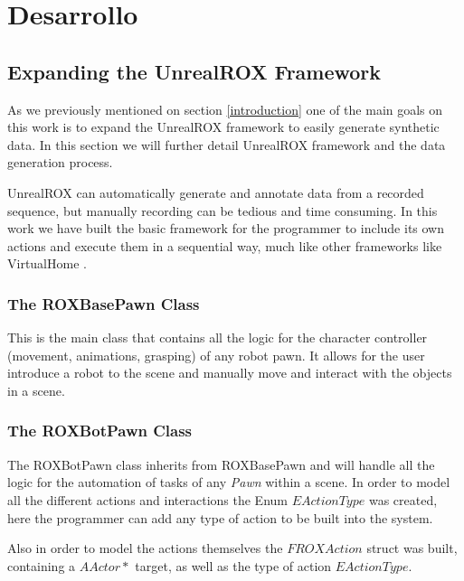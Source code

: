 
\chapter{Desarrollo}
\label{desarrollo}

\section{Expanding the UnrealROX Framework}
As we previously mentioned on section \ref{introduction} one of the main goals on this work is to expand the UnrealROX framework to easily generate synthetic data. In this section we will further detail UnrealROX framework and the data generation process.

UnrealROX can automatically generate and annotate data from a recorded sequence, but manually recording can be tedious and time consuming. In this work we have built the basic framework for the programmer to include its own actions and execute them in a sequential way, much like other frameworks like VirtualHome \cite{virtualhome2018}. 

\subsection{The ROXBasePawn Class}
This is the main class that contains all the logic for the character controller (movement, animations, grasping) of any robot pawn. It allows for the user introduce a robot to the scene and manually move and interact with the objects in a scene.

\subsection{The ROXBotPawn Class}
The ROXBotPawn class inherits from ROXBasePawn and will handle all the logic for the automation of tasks of any \textit{Pawn} within a scene. In order to model all the different actions and interactions the Enum $EActionType$ was created, here the programmer can add any type of action to be built into the system.

Also in order to model the actions themselves the $FROXAction$ struct was built, containing a $AActor*$ target, as well as the type of action $EActionType$.

